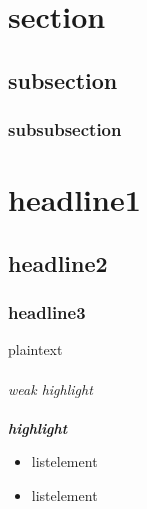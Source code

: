 \documentclass[10pt,a4paper]{article}
\begin{document}
\section{section}
\subsection{subsection}
\subsubsection{subsubsection}

\section*{headline1}
\subsection*{headline2}
\subsubsection*{headline3}

plaintext \\
\\
\textit{weak highlight} \\
\\
\textbf{\textit{highlight}}

\begin{itemize}
	\item listelement
	\item listelement
\end{itemize}
\end{document}
